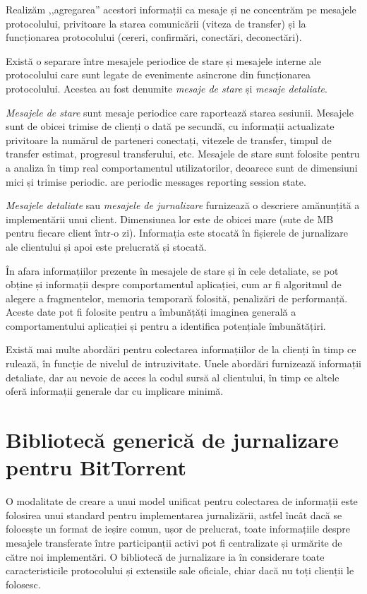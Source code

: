 Realizăm ,,agregarea'' acestori informații ca mesaje și ne concentrăm pe
mesajele protocolului, privitoare la starea comunicării (viteza de transfer)
și la funcționarea protocolului (cereri, confirmări, conectări, deconectări).

Există o separare între mesajele periodice de stare și mesajele interne ale
protocolului care sunt legate de evenimente asincrone din funcționarea
protocolului. Acestea au fost denumite \textit{mesaje de stare} și
\textit{mesaje detaliate}.

\textit{Mesajele de stare} sunt mesaje periodice care raportează starea
sesiunii. Mesajele sunt de obicei trimise de clienți o dată pe secundă, cu
informații actualizate privitoare la numărul de parteneri conectați,
vitezele de transfer, timpul de transfer estimat, progresul transferului, etc.
Mesajele de stare sunt folosite pentru a analiza în timp real comportamentul
utilizatorilor, deoarece sunt de dimensiuni mici și trimise periodic.
are periodic messages reporting session state.

\textit{Mesajele detaliate} sau \textit{mesajele de jurnalizare} 
furnizează o descriere amănunțită a implementării unui client. Dimensiunea lor
este de obicei mare (sute de MB pentru fiecare client într-o zi). Informația
este stocată în fișierele de jurnalizare ale clientului și apoi este prelucrată
și stocată.

În afara informațiilor prezente în mesajele de stare și în cele detaliate,
se pot obține și informații despre comportamentul aplicației, cum ar fi
algoritmul de alegere a fragmentelor, memoria temporară folosită, penalizări
de performanță. Aceste date pot fi folosite pentru a îmbunățăți imaginea
generală a comportamentului aplicației și pentru a identifica potențiale
îmbunătățiri.

Există mai multe abordări pentru colectarea informațiilor de la clienți în
timp ce rulează, în funcție de nivelul de intruzivitate. Unele abordări
furnizează informații detaliate, dar au nevoie de acces la codul sursă al
clientului, în timp ce altele oferă informații generale dar cu implicare minimă.

\section{Bibliotecă generică de jurnalizare pentru BitTorrent}
\label{sec:proto-measure:log-library}

O modalitate de creare a unui model unificat pentru colectarea de informații
este folosirea unui standard pentru implementarea jurnalizării, astfel încât
dacă se foloesște un format de ieșire comun, ușor de prelucrat, toate
informațiile despre mesajele transferate între participanții activi pot fi
centralizate și urmărite de către noi implementări. O bibliotecă de jurnalizare
ia în considerare toate caracteristicile protocolului și extensiile sale
oficiale, chiar dacă nu toți clienții le folosesc.

